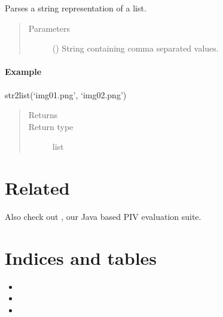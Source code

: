 \documentclass[letterpaper,10pt,english]{sphinxmanual}
\begin{document}

\begin{fulllineitems}
\label{\detokenize{open_piv_gui_tools:openpivgui.open_piv_gui_tools.str2list}}
Parses a string representation of a list.
\begin{quote}\begin{description}
\item[{Parameters}] \leavevmode
{} () \textendash{} String containing comma separated values.

\end{description}\end{quote}
\subsubsection*{Example}

str2list(‘img01.png’, ‘img02.png’)
\begin{quote}\begin{description}
\item[{Returns}] \leavevmode


\item[{Return type}] \leavevmode
list

\end{description}\end{quote}

\end{fulllineitems}



\chapter{Related}
\label{\detokenize{related:related}}\label{\detokenize{related::doc}}
Also check out , our Java based PIV evaluation suite.


\chapter{Indices and tables}
\label{\detokenize{index:indices-and-tables}}\begin{itemize}
\item {} 

\item {} 

\item {} 

\end{itemize}
\end{document}
